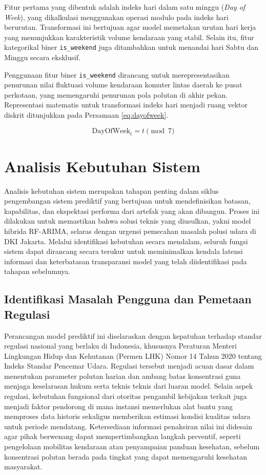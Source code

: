 Fitur pertama yang dibentuk adalah indeks hari dalam satu minggu (\textit{Day of Week}), yang dikalkulasi menggunakan operasi modulo pada indeks hari berurutan. Transformasi ini bertujuan agar model memetakan urutan hari kerja yang menunjukkan karakteristik volume kendaraan yang stabil. Selain itu, fitur kategorikal biner \texttt{is\_weekend} juga ditambahkan untuk menandai hari Sabtu dan Minggu secara eksklusif. 

Penggunaan fitur biner \texttt{is\_weekend} dirancang untuk merepresentasikan penurunan nilai fluktuasi volume kendaraan komuter lintas daerah ke pusat perkotaan, yang memengaruhi penurunan pola polutan di akhir pekan. Representasi matematis untuk transformasi indeks hari menjadi ruang vektor diskrit ditunjukkan pada Persamaan \ref{eq:dayofweek}.

\begin{equation}
    \text{DayOfWeek}_t = t \pmod 7
    \label{eq:dayofweek}
\end{equation}

\section{Analisis Kebutuhan Sistem}

Analisis kebutuhan sistem merupakan tahapan penting dalam siklus pengembangan sistem prediktif yang bertujuan untuk mendefinisikan batasan, kapabilitas, dan ekspektasi performa dari artefak yang akan dibangun. Proses ini dilakukan untuk memastikan bahwa solusi teknis yang diusulkan, yakni model hibrida RF-ARIMA, selaras dengan urgensi pemecahan masalah polusi udara di DKI Jakarta. Melalui identifikasi kebutuhan secara mendalam, seluruh fungsi sistem dapat dirancang secara terukur untuk meminimalkan kendala latensi informasi dan keterbatasan transparansi model yang telah diidentifikasi pada tahapan sebelumnya.

\subsection{Identifikasi Masalah Pengguna dan Pemetaan Regulasi}

Perancangan model prediktif ini diselaraskan dengan kepatuhan terhadap standar regulasi nasional yang berlaku di Indonesia, khususnya Peraturan Menteri Lingkungan Hidup dan Kehutanan (Permen LHK) Nomor 14 Tahun 2020 tentang Indeks Standar Pencemar Udara. Regulasi tersebut menjadi acuan dasar dalam menentukan parameter polutan harian dan ambang batas konsentrasi guna menjaga keselarasan hukum serta teknis teknis dari luaran model. Selain aspek regulasi, kebutuhan fungsional dari otoritas pengambil kebijakan terkait juga menjadi faktor pendorong di mana instansi memerlukan alat bantu yang memproses data historis sekaligus memberikan estimasi kondisi kualitas udara untuk periode mendatang. Ketersediaan informasi penaksiran nilai ini didesain agar pihak berwenang dapat mempertimbangkan langkah preventif, seperti pengelolaan mobilitas kendaraan atau penyampaian panduan kesehatan, sebelum konsentrasi polutan berada pada tingkat yang dapat memengaruhi kesehatan masyarakat.

